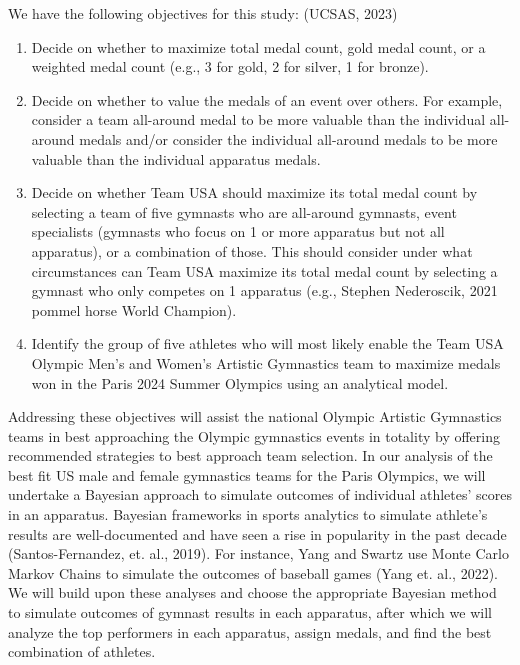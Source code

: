 \documentclass[
  letterpaper,
  DIV=11,
  numbers=noendperiod]{scrartcl}
\begin{document}
We have the following objectives for this study: (UCSAS, 2023)

\begin{enumerate}
\def\labelenumi{\arabic{enumi})}
\item
  Decide on whether to maximize total medal count, gold medal count, or
  a weighted medal count (e.g., 3 for gold, 2 for silver, 1 for bronze).
\item
  Decide on whether to value the medals of an event over others. For
  example, consider a team all-around medal to be more valuable than the
  individual all-around medals and/or consider the individual all-around
  medals to be more valuable than the individual apparatus medals.
\item
  Decide on whether Team USA should maximize its total medal count by
  selecting a team of five gymnasts who are all-around gymnasts, event
  specialists (gymnasts who focus on 1 or more apparatus but not all
  apparatus), or a combination of those. This should consider under what
  circumstances can Team USA maximize its total medal count by selecting
  a gymnast who only competes on 1 apparatus (e.g., Stephen Nederoscik,
  2021 pommel horse World Champion).
\item
  Identify the group of five athletes who will most likely enable the
  Team USA Olympic Men's and Women's Artistic Gymnastics team to
  maximize medals won in the Paris 2024 Summer Olympics using an
  analytical model.
\end{enumerate}

Addressing these objectives will assist the national Olympic Artistic
Gymnastics teams in best approaching the Olympic gymnastics events in
totality by offering recommended strategies to best approach team
selection. In our analysis of the best fit US male and female gymnastics
teams for the Paris Olympics, we will undertake a Bayesian approach to
simulate outcomes of individual athletes' scores in an apparatus.
Bayesian frameworks in sports analytics to simulate athlete's results
are well-documented and have seen a rise in popularity in the past
decade (Santos-Fernandez, et. al., 2019). For instance, Yang and Swartz
use Monte Carlo Markov Chains to simulate the outcomes of baseball games
(Yang et. al., 2022). We will build upon these analyses and choose the
appropriate Bayesian method to simulate outcomes of gymnast results in
each apparatus, after which we will analyze the top performers in each
apparatus, assign medals, and find the best combination of athletes.
\end{document}
